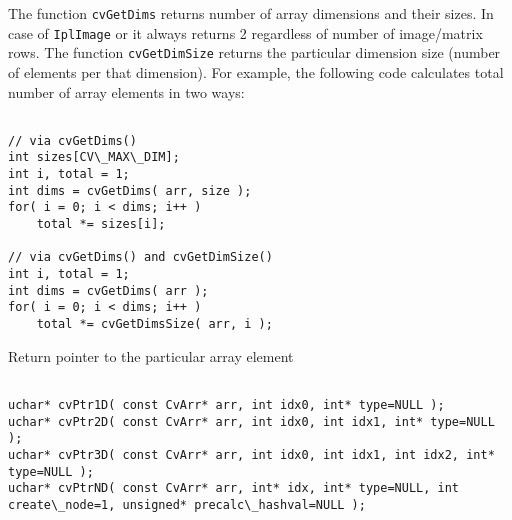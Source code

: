 The function \texttt{cvGetDims} returns number of array dimensions and their sizes. In case of \texttt{IplImage} or  it always returns 2 regardless of number of image/matrix rows. The function \texttt{cvGetDimSize} returns the particular dimension size (number of elements per that dimension). For example, the following code calculates total number of array elements in two ways:

\begin{lstlisting}

// via cvGetDims()
int sizes[CV\_MAX\_DIM];
int i, total = 1;
int dims = cvGetDims( arr, size );
for( i = 0; i < dims; i++ )
    total *= sizes[i];

// via cvGetDims() and cvGetDimSize()
int i, total = 1;
int dims = cvGetDims( arr );
for( i = 0; i < dims; i++ )
    total *= cvGetDimsSize( arr, i );

\end{lstlisting}


\label{PtrnD}

Return pointer to the particular array element

\begin{lstlisting}

uchar* cvPtr1D( const CvArr* arr, int idx0, int* type=NULL );
uchar* cvPtr2D( const CvArr* arr, int idx0, int idx1, int* type=NULL );
uchar* cvPtr3D( const CvArr* arr, int idx0, int idx1, int idx2, int* type=NULL );
uchar* cvPtrND( const CvArr* arr, int* idx, int* type=NULL, int create\_node=1, unsigned* precalc\_hashval=NULL );

\end{lstlisting}

\begin{description}
\end{description}

